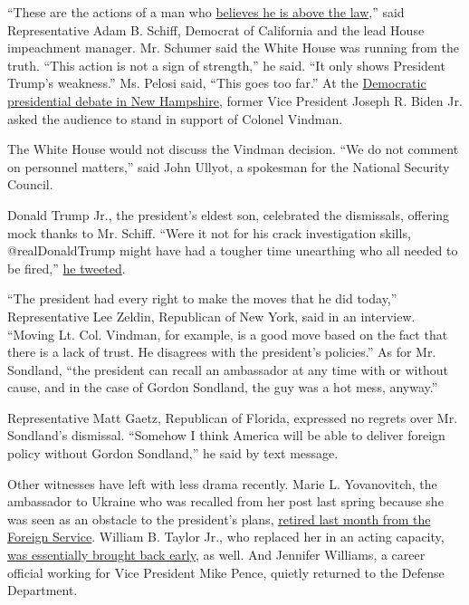 ``These are the actions of a man who
\href{https://twitter.com/RepAdamSchiff/status/1225952767803523073}{believes
he is above the law},'' said Representative Adam B. Schiff, Democrat of
California and the lead House impeachment manager. Mr. Schumer said the
White House was running from the truth. ``This action is not a sign of
strength,'' he said. ``It only shows President Trump's weakness.'' Ms.
Pelosi said, ``This goes too far.'' At the
\href{https://www.nytimes.com/2020/02/07/us/politics/democratic-debate-tonight.html?action=click\&module=Top\%20Stories\&pgtype=Homepage}{Democratic
presidential debate in New Hampshire}, former Vice President Joseph R.
Biden Jr. asked the audience to stand in support of Colonel Vindman.

The White House would not discuss the Vindman decision. ``We do not
comment on personnel matters,'' said John Ullyot, a spokesman for the
National Security Council.

Donald Trump Jr., the president's eldest son, celebrated the dismissals,
offering mock thanks to Mr. Schiff. ``Were it not for his crack
investigation skills, @realDonaldTrump might have had a tougher time
unearthing who all needed to be fired,''
\href{https://twitter.com/DonaldJTrumpJr/status/1225941861765918720}{he
tweeted}.

``The president had every right to make the moves that he did today,''
Representative Lee Zeldin, Republican of New York, said in an interview.
``Moving Lt. Col. Vindman, for example, is a good move based on the fact
that there is a lack of trust. He disagrees with the president's
policies.'' As for Mr. Sondland, ``the president can recall an
ambassador at any time with or without cause, and in the case of Gordon
Sondland, the guy was a hot mess, anyway.''

Representative Matt Gaetz, Republican of Florida, expressed no regrets
over Mr. Sondland's dismissal. ``Somehow I think America will be able to
deliver foreign policy without Gordon Sondland,'' he said by text
message.

Other witnesses have left with less drama recently. Marie L.
Yovanovitch, the ambassador to Ukraine who was recalled from her post
last spring because she was seen as an obstacle to the president's
plans,
\href{https://www.nytimes.com/2020/01/31/us/politics/ambassador-ukraine-impeachment-retires.html}{retired
last month from the Foreign Service}. William B. Taylor Jr., who
replaced her in an acting capacity,
\href{https://www.nytimes.com/2019/12/17/world/europe/william-taylor-ukraine.html}{was
essentially brought back early}, as well. And Jennifer Williams, a
career official working for Vice President Mike Pence, quietly returned
to the Defense Department.

